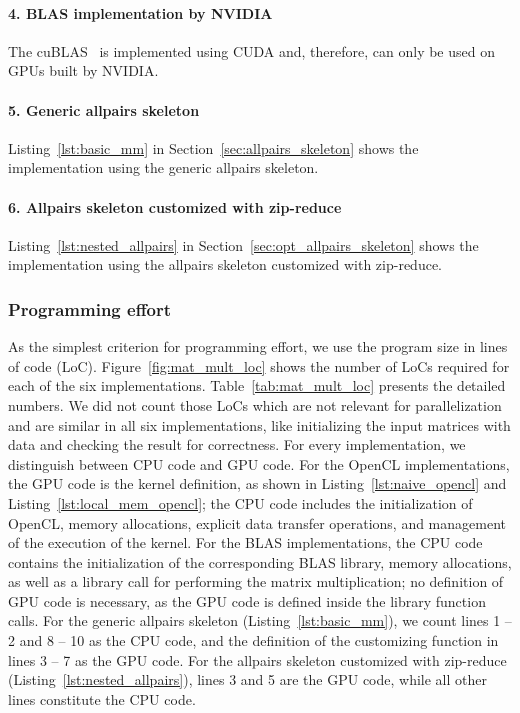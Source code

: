 \paragraph{4. BLAS implementation by NVIDIA}
The cuBLAS~\cite{NVIDIA-13} is implemented using CUDA and, therefore, can only be used on GPUs built by NVIDIA.

\vspace{-.5em}
\paragraph{5. Generic allpairs skeleton}
Listing~\ref{lst:basic_mm} in Section~\ref{sec:allpairs_skeleton} shows the implementation using the generic allpairs skeleton.

\vspace{-.5em}
\paragraph{6. Allpairs skeleton customized with zip-reduce}
Listing~\ref{lst:nested_allpairs} in Section~\ref{sec:opt_allpairs_skeleton} shows the implementation using the allpairs skeleton customized with zip-reduce.


\subsubsection*{Programming effort}
As the simplest criterion for programming effort, we use the program size in lines of code (LoC).
Figure~\ref{fig:mat_mult_loc} shows the number of LoCs required for each of the six implementations.
Table~\ref{tab:mat_mult_loc} presents the detailed numbers.
We did not count those LoCs which are not relevant for parallelization and are similar in all six implementations, like initializing the input matrices with data and checking the result for correctness.
For every implementation, we distinguish between CPU code and GPU code.
For the OpenCL implementations, the GPU code is the kernel definition, as shown in Listing~\ref{lst:naive_opencl} and Listing~\ref{lst:local_mem_opencl};
the CPU code includes the initialization of OpenCL, memory allocations, explicit data transfer operations, and management of the execution of the kernel.
For the BLAS implementations, the CPU code contains the initialization of the corresponding BLAS library, memory allocations, as well as a library call for performing the matrix multiplication;
no definition of GPU code is necessary, as the GPU code is defined inside the library function calls.
For the generic allpairs skeleton (Listing~\ref{lst:basic_mm}), we count lines 1 -- 2 and 8 -- 10 as the CPU code, and the definition of the customizing function in lines 3 -- 7 as the GPU code.
For the allpairs skeleton customized with zip-reduce (Listing~\ref{lst:nested_allpairs}), lines 3 and 5 are the GPU code, while all other lines constitute the CPU code.


